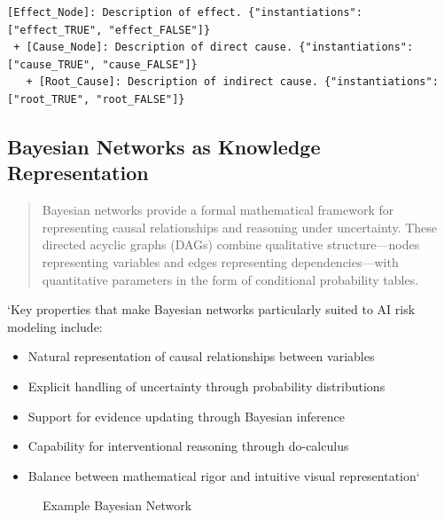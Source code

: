 \documentclass[12pt,a4paper]{report}
\providecommand{\tightlist}{%
  \setlength{\itemsep}{0pt}\setlength{\parskip}{0pt}}
\begin{document}
\begin{verbatim}
[Effect_Node]: Description of effect. {"instantiations": ["effect_TRUE", "effect_FALSE"]}
 + [Cause_Node]: Description of direct cause. {"instantiations": ["cause_TRUE", "cause_FALSE"]}
   + [Root_Cause]: Description of indirect cause. {"instantiations": ["root_TRUE", "root_FALSE"]}
\end{verbatim}

\subsection{Bayesian Networks as Knowledge
Representation}\label{sec-bayesian-networks}

\begin{quote}
Bayesian networks provide a formal mathematical framework for
representing causal relationships and reasoning under uncertainty. These
directed acyclic graphs (DAGs) combine qualitative structure---nodes
representing variables and edges representing dependencies---with
quantitative parameters in the form of conditional probability tables.
\end{quote}

`Key properties that make Bayesian networks particularly suited to AI
risk modeling include:

\begin{itemize}
\tightlist
\item
  Natural representation of causal relationships between variables
\item
  Explicit handling of uncertainty through probability distributions
\item
  Support for evidence updating through Bayesian inference
\item
  Capability for interventional reasoning through do-calculus
\item
  Balance between mathematical rigor and intuitive visual
  representation`
\end{itemize}

\begin{figure}


\caption{\label{fig-bayesian-network}Example Bayesian Network}

\end{figure}%
\end{document}
